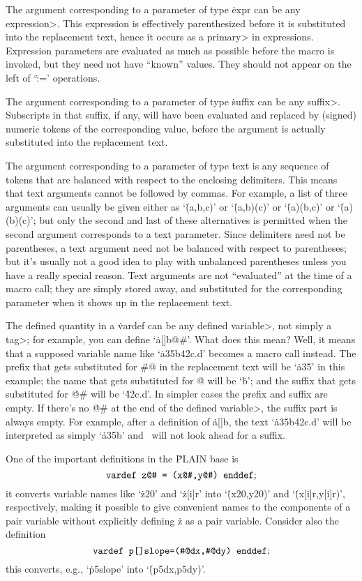 The argument corresponding to a parameter of type \.{expr} can be any
\<expression>.  This expression is effectively parenthesized before it is
substituted into the replacement text, hence it occurs as a \<primary> in
expressions.  Expression parameters are evaluated as much as possible
before the macro is invoked, but they need not have ``known'' values. They
should not appear on the left of `\.{:=}' operations.

The argument corresponding to a parameter of type \.{suffix} can be any
\<suffix>.  Subscripts in that suffix, if any, will have been evaluated
and replaced by (signed) numeric tokens of the corresponding value, before
the argument is actually substituted into the replacement text.

The argument corresponding to a parameter of type \.{text} is any sequence
of tokens that are balanced with respect to the enclosing delimiters.
This means that text arguments cannot be followed by commas. For example,
a list of three arguments can usually be given either as `\.{(a,b,c)}'
or `\.{(a,b)(c)}' or `\.{(a)(b,c)}' or `\.{(a)(b)(c)}'; but only the
second and last of these alternatives is permitted when the second
argument corresponds to a text parameter. Since delimiters need not
be parentheses, a text argument need not be balanced with respect
to parentheses; but it's usually not a good idea to play with
unbalanced parentheses unless you have a really special reason. Text
arguments are not ``evaluated'' at the time of a macro call; they are
simply stored away, and substituted for the corresponding parameter when
it shows up in the replacement text.

The defined quantity in a \.{vardef} can be any \<defined variable>, not simply
a \<tag>; for example, you can define `\.{a[]b@\#}'. What does this mean? Well,
it means that a supposed variable name like `\.{a35b42c.d}' becomes a
macro call instead. The prefix that gets substituted for \.{\#@} in the
replacement text will be `\.{a35}' in this example; the name that gets
substituted for \.@ will be `\.b'; and the suffix that gets substituted
for \.{@\#} will be `\.{42c.d}'. In simpler cases the prefix and suffix
are empty. If there's no \.{@\#} at the end of the \<defined variable>,
the suffix part is always empty. For example, after a definition of
\.{a[]b}, the text `\.{a35b42c.d}' will be interpreted as simply `\.{a35b}'
and \MF\ will not look ahead for a suffix.

One of the important definitions in the \.{PLAIN} base is
$$\hbox{\tt vardef z@\# = (x@\#,y@\#) enddef};$$
it converts variable names like `\.{z20}' and `\.{z[i]r}' into
`\.{(x20,y20)}' and `\.{(x[i]r,y[i]r)}', respectively, making it
possible to give convenient names to the components of a pair
variable without explicitly defining \.z as a pair variable.
Consider also the definition
$$\hbox{\tt vardef p[]slope=(\#@dx,\#@dy) enddef};$$
this converts, e.g., `\.{p5slope}' into `\.{(p5dx,p5dy)}'.

